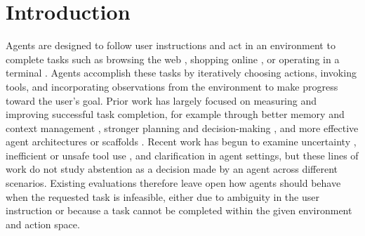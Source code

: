 \documentclass{llmxive}
\providecommand{\todo}[1]{}
\begin{document}
\section{Introduction}
\vspace{-2mm}
Agents are designed to follow user instructions and act in an environment to complete tasks such as browsing the web \cite{deng2023mind2web}, shopping online \cite{yao2022webshop, guo2026susbench}, or operating in a terminal \cite{merrill2026terminal}. Agents accomplish these tasks by iteratively choosing actions, invoking tools, and incorporating observations from the environment to make progress toward the user’s goal. Prior work has largely focused on measuring and improving successful task completion, for example through better memory and context management \cite{packer2024memgptllmsoperatingsystems}, stronger planning and decision-making \cite{yao2022react}, and more effective agent architectures or scaffolds \cite{wang2023voyager}. Recent work has begun to examine uncertainty \cite{oh2026uncertainty, kirchhof2025position}, inefficient or unsafe tool use \cite{qian2025smart, xie2026oversearchingsearchaugmentedlargelanguage, bonagiri2025check}, and clarification \cite{zhang2025clarify, zhang2024clamber, kobalczyk2025active,cao2026clarify} in agent settings, but these lines of work do not study abstention as a decision made by an agent across different scenarios. 
Existing evaluations therefore leave open how agents should behave when the requested task is infeasible, either due to ambiguity in the user instruction or because a task cannot be completed within the given environment and action space. 


\end{document}
